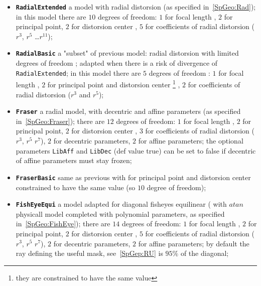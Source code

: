 \begin{itemize}

   \item {\tt \bf RadialExtended} a model with radial distorsion 
         (as specified in~\ref{SpGeo:Rad}); 
         in this model there are $10$ degrees of freedom:
         $1$ for focal length  , $2$ for principal point, $2$ for distorsion center , 
         $5$ for coefficients of radial distorsion ($r^3$, $r^5$ \dots $r^{11}$);

   \item {\tt \bf RadialBasic}  a "subset" of previous model:
          radial distorsion with limited degrees of freedom ;
         adapted when there is a risk of divergence of {\tt RadialExtended}; 
         in this model there are $5$ degrees of freedom :  $1$ for focal length  , 
         $2$ for principal point and distorsion center \footnote{they are constrained to have 
         the same value} ,
         $2$ for coefficients of radial distorsion ($r^3$ and  $r^5$);



   \item {\tt \bf Fraser}  a radial model, with decentric and affine parameters
          (as specified in~\ref{SpGeo:Fraser}); there are $12$ degrees of freedom:
         $1$ for focal length  , $2$ for principal point, $2$ for distorsion center , 
         $3$ for coefficients of radial distorsion ($r^3$, $r^5$  $r^7$),
         $2$ for decentric parameters, $2$ for affine parameters;
         the optional parameters {\tt LibAff} and {\tt LibDec} (def value true) can
         be set to false if decentric of affine parameters must stay frozen;


   \item {\tt \bf FraserBasic}  same as previous with for principal point and distorsion center
         constrained to have the same value (so $10$ degree of freedom);

   \item {\tt \bf FishEyeEqui}  a model adapted for diagonal fisheyes equilinear
         ( with $atan$ physicall model completed with polynomial parameters,
          as specified in~\ref{SpGeo:FishEye}); there are $14$ degrees of freedom:
         $1$ for focal length  , $2$ for principal point, $2$ for distorsion center , 
         $5$ for coefficients of radial distorsion ($r^3$, $r^5$  $r^7$),
         $2$ for decentric parameters, $2$ for affine parameters;
         by default the ray defining the useful mask, see~\ref{SpGep:RU}
         is $95\%$ of the diagonal;



\end{itemize}
